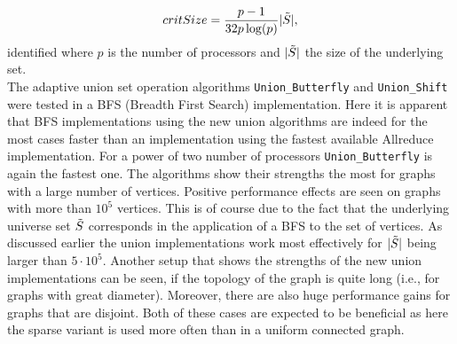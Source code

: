 \begin{align*}
	critSize = \frac{p-1}{32p\log(p)}|\Tilde{S}|,
\end{align*}
identified where $p$ is the number of processors and $|\Tilde{S}|$ the size of the underlying set.\\
The adaptive union set operation algorithms \texttt{Union\_Butterfly} and \texttt{Union\_Shift} were tested in a BFS (Breadth First Search) implementation. Here it is apparent that BFS implementations using the new union algorithms are indeed for the most cases faster than an implementation using the fastest available Allreduce implementation. For a power of two number of processors \texttt{Union\_Butterfly} is again the fastest one. 
The algorithms show their strengths the most for graphs with a large number of vertices. Positive performance effects are seen on graphs with more than $10^5$ vertices. This is of course due to the fact that the underlying universe set $\Tilde{S}$ corresponds in the application of a BFS to the set of vertices. As discussed earlier the union implementations work most effectively for $|\Tilde{S}|$ being larger than $5\cdot 10^5$.  Another setup that shows the strengths of the new union implementations can be seen, if the topology of the graph is quite long (i.e., for graphs with great diameter). Moreover, there are also huge performance gains for graphs that are disjoint. Both of these cases are expected to be beneficial as here the sparse variant is used more often than in a uniform connected graph.

